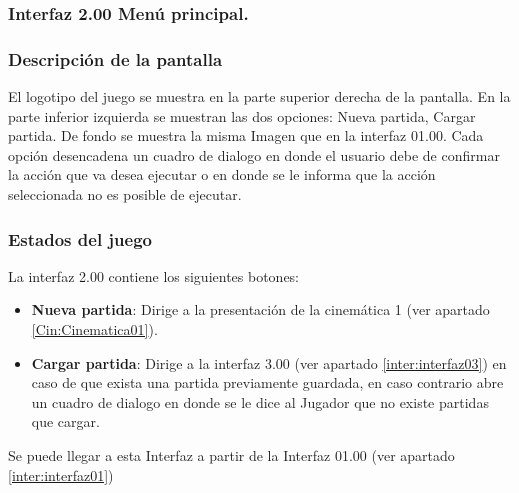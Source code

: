 \subsubsection{Interfaz 2.00 Menú principal.} \label{inter:interfaz02}
	\subsubsection{Descripción de la pantalla}
El logotipo del juego se muestra en la parte superior derecha de la pantalla. En la parte inferior izquierda se muestran las dos opciones: Nueva partida, Cargar partida. De fondo se muestra la misma Imagen que en la interfaz 01.00. 
Cada opción desencadena un cuadro de dialogo en donde el usuario debe de confirmar la acción que va desea ejecutar o en donde se le informa que la acción seleccionada no es posible de ejecutar.
	\subsubsection{Estados del juego}
La interfaz 2.00 contiene los siguientes botones:
\begin{itemize}
	\item \textbf{Nueva partida}:  Dirige a la presentación de la cinemática 1 (ver apartado \ref{Cin:Cinematica01}).
	\item \textbf{Cargar partida}: Dirige a la interfaz 3.00 (ver apartado \ref{inter:interfaz03}) en caso de que exista una partida previamente guardada, en caso contrario abre un cuadro de dialogo en donde se le dice al Jugador que no existe partidas que cargar.
\end{itemize}
Se puede llegar a esta Interfaz a partir de la Interfaz 01.00 (ver apartado \ref{inter:interfaz01})
